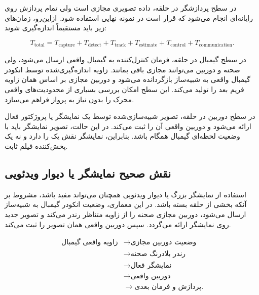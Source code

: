 \documentclass[12pt,a4paper]{article}
\begin{document}
در سطح پردازشگر در حلقه، داده تصویری مجازی است ولی تمام پردازش
روی رایانه‌ای انجام می‌شود که قرار است در نمونه نهایی استفاده شود.
ازاین‌رو، زمان‌های زیر باید مستقیماً اندازه‌گیری شوند:

\begin{equation}
	T_{\mathrm{total}}
	=
	T_{\mathrm{capture}}
	+
	T_{\mathrm{detect}}
	+
	T_{\mathrm{track}}
	+
	T_{\mathrm{estimate}}
	+
	T_{\mathrm{control}}
	+
	T_{\mathrm{communication}}.
	\label{eq:hil_latency_budget}
\end{equation}

در سطح گیمبال در حلقه، فرمان کنترل‌کننده به گیمبال واقعی ارسال
می‌شود، ولی صحنه و دوربین می‌توانند مجازی باقی بمانند. زاویه
اندازه‌گیری‌شده توسط انکودر گیمبال واقعی به شبیه‌ساز بازگردانده
می‌شود و دوربین مجازی بر اساس همان زاویه فریم بعد را تولید می‌کند.
این سطح امکان بررسی بسیاری از محدودیت‌های واقعی محرک را بدون
نیاز به پرواز فراهم می‌سازد.

در سطح دوربین در حلقه، تصویر شبیه‌سازی‌شده توسط یک نمایشگر یا
پروژکتور فعال ارائه می‌شود و دوربین واقعی آن را ثبت می‌کند.
در این حالت، تصویر نمایشگر باید با وضعیت لحظه‌ای گیمبال همگام
باشد. بنابراین، نمایشگر نقش یک
را دارد و نه یک پخش‌کننده فیلم ثابت.

\subsection{نقش صحیح نمایشگر یا دیوار ویدئویی}
\label{subsec:active_display_role}

استفاده از نمایشگر بزرگ یا دیوار ویدئویی همچنان می‌تواند مفید
باشد، مشروط بر آنکه بخشی از حلقه بسته باشد. در این معماری، وضعیت
انکودر گیمبال به شبیه‌ساز ارسال می‌شود، دوربین مجازی صحنه را از
زاویه متناظر رندر می‌کند و تصویر جدید روی نمایشگر ارائه می‌گردد.
سپس دوربین واقعی همان تصویر را ثبت می‌کند.

\begin{equation}
	\begin{aligned}
		\text{زاویه واقعی گیمبال}
		&\longrightarrow
		\text{وضعیت دوربین مجازی}
		\\
		&\longrightarrow
		\text{رندر بلادرنگ صحنه}
		\\
		&\longrightarrow
		\text{نمایشگر فعال}
		\\
		&\longrightarrow
		\text{دوربین واقعی}
		\\
		&\longrightarrow
		\text{پردازش و فرمان بعدی}.
	\end{aligned}
	\label{eq:active_display_hil}
\end{equation}
\end{document}
